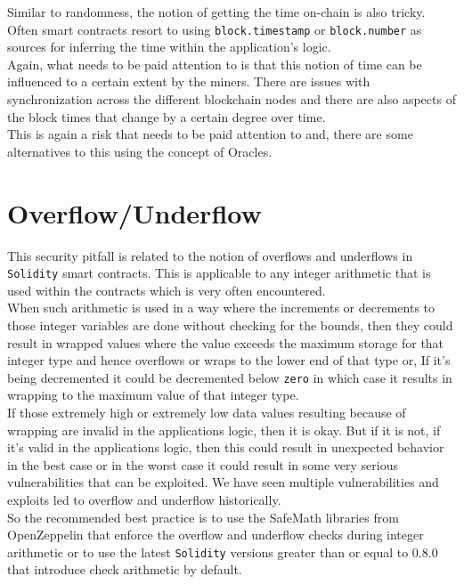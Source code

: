 Similar to randomness, the notion of getting the time on-chain is also tricky. Often smart contracts resort to using \texttt{block.timestamp} or \texttt{block.number} as sources for inferring the time within the application's logic. \\

Again, what needs to be paid attention to is that this notion of time can be influenced to a certain extent by the miners. There are issues with synchronization across the different blockchain nodes and there are also aspects of the block times that change by a certain degree over time.\\

This is again a risk that needs to be paid attention to and, there are some alternatives to this using the concept of Oracles. 

\section{Overflow/Underflow}

This security pitfall is related to the notion of overflows and underflows in \texttt{Solidity} smart contracts. This is applicable to any integer arithmetic that is used within the contracts which is very often encountered. \\

When such arithmetic is used in a way where the increments or decrements to those integer variables are done without checking for the bounds, then they could result in wrapped values where the value exceeds the maximum storage for that integer type and hence overflows or wraps to the lower end of that type or, If it's being decremented it could be decremented below \texttt{zero} in which case it results in wrapping to the maximum value of that integer type.\\

If those extremely high or extremely low data values resulting because of wrapping are invalid in the applications logic, then it is okay. But if it is not, if it's valid in the applications logic, then this could result in unexpected behavior in the best case or in the worst case it could result in some very serious vulnerabilities that can be exploited. We have seen multiple vulnerabilities and exploits led to overflow and underflow historically.\\

So the recommended best practice is to use the SafeMath libraries from OpenZeppelin that enforce the overflow and underflow checks during integer arithmetic or to use the latest \texttt{Solidity} versions greater than or equal to 0.8.0 that introduce check arithmetic by default.

